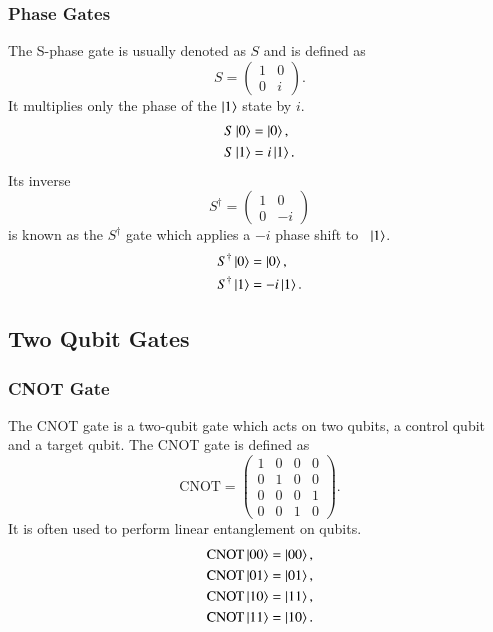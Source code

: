 \subsubsection{Phase Gates}
The S-phase gate is usually denoted as $ S $ and is defined as
\begin{equation}
	S = \begin{pmatrix}
		1 & 0 \\
		0 & i
	\end{pmatrix}.
\end{equation}
It multiplies only the phase of the $ \ket{1} $ state by $ i $.
\begin{align}
	S\ket{0} &= \ket{0}, \\
	S\ket{1} &= i\ket{1}.
\end{align}
Its inverse
\begin{equation}
	S^\dagger = \begin{pmatrix}
		1 & 0 \\
		0 & -i
	\end{pmatrix}
\end{equation}
is known as the $ S^\dagger $ gate which applies a $ -i $ phase shift to \ $ \ket{1}$.
\begin{align}
	S^\dagger\ket{0} &= \ket{0}, \\
	S^\dagger\ket{1} &= -i\ket{1}.
\end{align}

\subsection{Two Qubit Gates}
\subsubsection{CNOT Gate}
\label{ssub:cnot_gate}
The CNOT gate is a two-qubit gate which acts on two qubits, a control qubit and a target qubit. The CNOT gate is defined as
\begin{equation}
	\text{CNOT} = \begin{pmatrix}
		1 & 0 & 0 & 0 \\
		0 & 1 & 0 & 0 \\
		0 & 0 & 0 & 1 \\
		0 & 0 & 1 & 0
	\end{pmatrix}.
\end{equation}
It is often used to perform linear entanglement on qubits.
\begin{align*}
	\label{eq:cnot-behaviour}
	\cnot \ket{00} &= \ket{00}, \\
	\cnot \ket{01} &= \ket{01}, \\
	\cnot \ket{10} &= \ket{11}, \\
	\cnot \ket{11} &= \ket{10}.
\end{align*}
